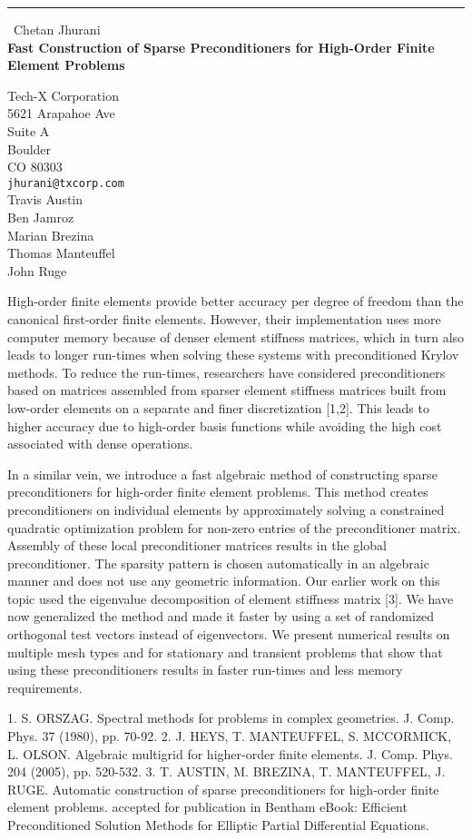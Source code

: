 \documentclass{report}
\begin{document}
\begin{center}
\rule{6in}{1pt} \
{\large Chetan Jhurani \\
{\bf Fast Construction of Sparse Preconditioners for High-Order Finite Element Problems}}

Tech-X Corporation \\ 5621 Arapahoe Ave \\ Suite A \\ Boulder \\ CO 80303
\\
{\tt jhurani@txcorp.com}\\
Travis Austin\\
Ben Jamroz\\
Marian Brezina\\
Thomas Manteuffel\\
John Ruge\end{center}

High-order finite elements provide better accuracy per degree of freedom
than the canonical first-order finite elements. However, their
implementation uses more computer memory because of denser element
stiffness matrices, which in turn also leads to longer run-times when
solving these systems with preconditioned Krylov methods. To reduce the
run-times, researchers have considered preconditioners based on matrices
assembled from sparser element stiffness matrices built from low-order
elements on a separate and finer discretization [1,2]. This leads to
higher accuracy due to high-order basis functions while avoiding the high
cost associated with dense operations.

In a similar vein, we introduce a fast algebraic method of constructing
sparse preconditioners for high-order finite element problems. This
method creates preconditioners on individual elements by approximately
solving a constrained quadratic optimization problem for non-zero entries
of the preconditioner matrix. Assembly of these local preconditioner
matrices results in the global preconditioner. The sparsity pattern is
chosen automatically in an algebraic manner and does not use any
geometric information. Our earlier work on this topic used the eigenvalue
decomposition of element stiffness matrix [3]. We have now generalized
the method and made it faster by using a set of randomized orthogonal
test vectors instead of eigenvectors. We present numerical results on
multiple mesh types and for stationary and transient problems that show
that using these preconditioners results in faster run-times and less
memory requirements.

1. S. ORSZAG. Spectral methods for problems in complex geometries. J.
Comp. Phys. 37 (1980), pp. 70-92.
2. J. HEYS, T. MANTEUFFEL, S. MCCORMICK, L. OLSON. Algebraic multigrid
for higher-order finite elements. J. Comp. Phys. 204 (2005), pp. 520-532.
3. T. AUSTIN, M. BREZINA, T. MANTEUFFEL, J. RUGE. Automatic construction
of sparse preconditioners for high-order finite element problems.
accepted for publication in Bentham eBook: Efficient Preconditioned
Solution Methods for Elliptic Partial Differential Equations.
\end{document}
